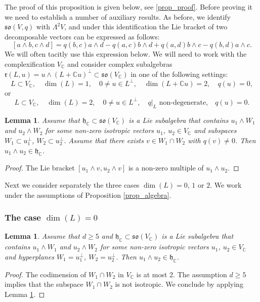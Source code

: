 \documentclass[11pt]{article}
\newcommand{\6}{\partial}
\newcommand{\bbC}{\mathbb{C}}
\newcommand{\frh}{\mathfrak{h}}
\newcommand{\frr}{\mathfrak{r}}
\newcommand{\frso}{\mathfrak{so}}
\renewcommand{\ge}{\geqslant}
\newcommand{\wdg}{\wedge}
\newtheorem{lem}[defn]{Lemma}
\begin{document}
The proof of this proposition is given below, see \ref{prop_proof}.
Before proving it we need to establish a number of auxiliary
results. As before, we identify $\frso(V,q)$ with $\Lambda^2V$, and
under this identification the Lie bracket of two decomposable vectors
can be expressed as follows:
$$
[a\wdg b,c\wdg d] = q(b,c)a\wdg d - q(a,c)b\wdg d + q(a,d)b\wdg c - q(b,d)a\wdg c.
$$
We will often tacitly use this expression below.
We will need to work with the complexification $V_\bbC$ and 
consider complex subalgebras $\frr(L,u) = u\wdg (L+ \bbC u)^\perp \subset \frso(V_\bbC)$
in one of the following settings:
\begin{equation}\label{eqn_set1}
L\subset V_\bbC,\quad\! \dim(L) = 1,\quad\! 0\neq u\in L^\perp,\quad\! \dim(L+\bbC u) = 2,\quad\! q(u) = 0,
\end{equation}
or
\begin{equation}\label{eqn_set2}
L\subset V_\bbC,\quad\!\! \dim(L) = 2,\quad\!\! 0\neq u\in L^\perp,\quad\!\! q|_L \mbox{ non-degenerate,} \quad\!\! q(u) = 0.
\end{equation}

\begin{lem}\label{lem_bracket}
Assume that $\frh_\bbC\subset\frso(V_\bbC)$ is a Lie subalgebra
that contains $u_1\wdg W_1$ and $u_2\wdg W_2$ for some non-zero isotropic vectors $u_1$, $u_2\in V_\bbC$
and subspaces $W_1\subset u_1^\perp$, $W_2\subset u_2^\perp$.
Assume that there exists $v\in W_1\cap W_2$ with $q(v) \neq 0$. Then $u_1\wdg u_2\in \frh_\bbC$.
\end{lem}
\begin{proof}
The Lie bracket $[u_1\wdg v, u_2\wdg v]$ is a non-zero multiple of $u_1\wdg u_2$.
\end{proof}

Next we consider separately the three cases $\dim(L) = 0$, $1$ or $2$. We work
under the assumptions of Proposition \ref{prop_algebra}.

\subsubsection{The case $\dim(L) = 0$}

\begin{lem}\label{lem_dim0}
Assume that $d\ge 5$ and $\frh_\bbC\subset\frso(V_\bbC)$ is a Lie subalgebra
that contains $u_1\wdg W_1$ and $u_2\wdg W_2$ for some non-zero isotropic vectors $u_1$, $u_2\in V_\bbC$
and hyperplanes $W_1 = u_1^\perp$, $W_2 = u_2^\perp$. Then $u_1\wdg u_2\in \frh_\bbC$.
\end{lem}
\begin{proof}
The codimension of $W_1\cap W_2$ in $V_\bbC$ is at most 2. The assumption $d\ge 5$ implies
that the subspace $W_1\cap W_2$ is not isotropic. We conclude by applying Lemma \ref{lem_bracket}. 
\end{proof}
\end{document}
